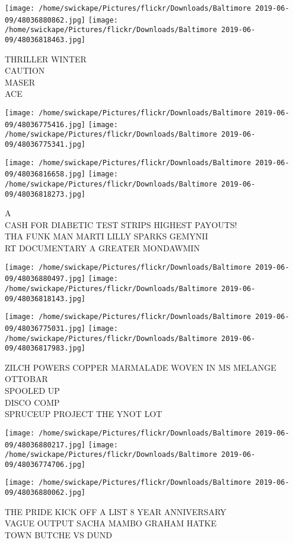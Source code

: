 \documentclass[10pt,letterpaper]{article}
\begin{document}
\texttt{[image: /home/swickape/Pictures/flickr/Downloads/Baltimore 2019-06-09/48036880862.jpg]}
\texttt{[image: /home/swickape/Pictures/flickr/Downloads/Baltimore 2019-06-09/48036818463.jpg]}

THRILLER WINTER\\
CAUTION\\
MASER\\
ACE
\pagebreak

\texttt{[image: /home/swickape/Pictures/flickr/Downloads/Baltimore 2019-06-09/48036775416.jpg]}
\texttt{[image: /home/swickape/Pictures/flickr/Downloads/Baltimore 2019-06-09/48036775341.jpg]}

\texttt{[image: /home/swickape/Pictures/flickr/Downloads/Baltimore 2019-06-09/48036816658.jpg]}
\texttt{[image: /home/swickape/Pictures/flickr/Downloads/Baltimore 2019-06-09/48036818273.jpg]}

A\\
CASH FOR DIABETIC TEST STRIPS HIGHEST PAYOUTS!\\
THA FUNK MAN MARTI LILLY SPARKS GEMYNII\\
RT DOCUMENTARY A GREATER MONDAWMIN
\pagebreak

\texttt{[image: /home/swickape/Pictures/flickr/Downloads/Baltimore 2019-06-09/48036880497.jpg]}
\texttt{[image: /home/swickape/Pictures/flickr/Downloads/Baltimore 2019-06-09/48036818143.jpg]}

\texttt{[image: /home/swickape/Pictures/flickr/Downloads/Baltimore 2019-06-09/48036775031.jpg]}
\texttt{[image: /home/swickape/Pictures/flickr/Downloads/Baltimore 2019-06-09/48036817983.jpg]}

ZILCH POWERS COPPER MARMALADE WOVEN IN MS MELANGE OTTOBAR\\
SPOOLED UP\\
DISCO COMP\\
SPRUCEUP PROJECT THE YNOT LOT
\pagebreak

\texttt{[image: /home/swickape/Pictures/flickr/Downloads/Baltimore 2019-06-09/48036880217.jpg]}
\texttt{[image: /home/swickape/Pictures/flickr/Downloads/Baltimore 2019-06-09/48036774706.jpg]}

\texttt{[image: /home/swickape/Pictures/flickr/Downloads/Baltimore 2019-06-09/48036880062.jpg]}

THE PRIDE KICK OFF A LIST 8 YEAR ANNIVERSARY\\
VAGUE OUTPUT SACHA MAMBO GRAHAM HATKE\\
TOWN BUTCHE VS DUND
\pagebreak
\end{document}
